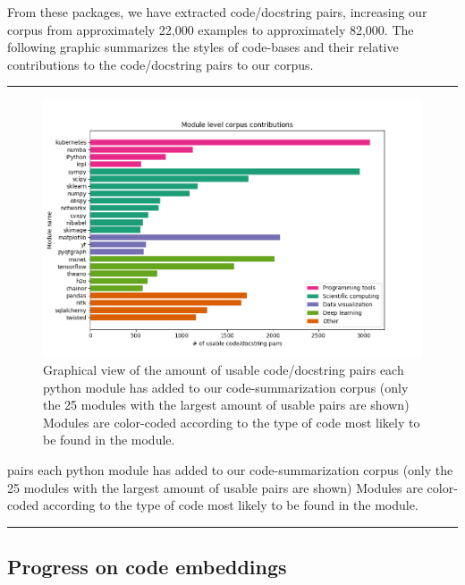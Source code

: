 \documentclass[article, 12pt, oneside]{memoir}
\begin{document}
From these packages, we have extracted code/docstring pairs, increasing
our corpus from approximately 22,000 examples to approximately 82,000.
The following graphic summarizes the styles of code-bases and their
relative contributions to the code/docstring pairs to our corpus.

\begin{center}\rule{0.5\linewidth}{\linethickness}\end{center}

\begin{figure}
\centering
\includegraphics{figs/module_corpus_contributions.png}
\caption{Graphical view of the amount of usable code/docstring pairs
each python module has added to our code-summarization corpus (only the
25 modules with the largest amount of usable pairs are shown) Modules
are color-coded according to the type of code most likely to be found in
the module.}
\end{figure}

pairs each python module has added to our code-summarization corpus
(only the 25 modules with the largest amount of usable pairs are shown)
Modules are color-coded according to the type of code most likely to be
found in the module.

\begin{center}\rule{0.5\linewidth}{\linethickness}\end{center}

\hypertarget{progress-on-code-embeddings}{%
\subsection{Progress on code
embeddings}\label{progress-on-code-embeddings}}
\end{document}
